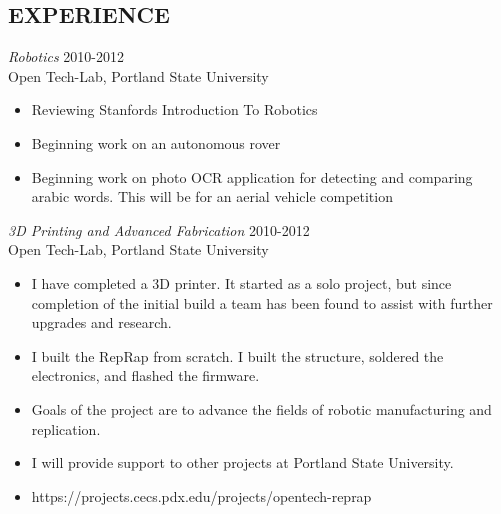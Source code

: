 \documentclass[margin]{res}
\begin{document}
\begin{resume}
\section{EXPERIENCE}
				{\sl Robotics} \hfill 2010-2012 \\
                Open Tech-Lab, Portland State University
				\begin{itemize}  \itemsep -2pt %
					\item   Reviewing Stanfords Introduction To Robotics
					\item	Beginning work on an autonomous rover
					\item   Beginning work on photo OCR application
							for detecting and comparing arabic words.  This 
							will be for an aerial vehicle competition
				\end{itemize}	
				{\sl 3D Printing and Advanced Fabrication} \hfill 2010-2012 \\
                Open Tech-Lab, Portland State University
				\begin{itemize}  \itemsep -2pt %
					\item   I have completed a 3D printer. It started as a solo project, 
							but since completion of the initial build a team has been found to
							assist with further upgrades and research.
					\item   I built the RepRap from scratch.  I built the structure, soldered 
							the electronics, and flashed the firmware.
					\item  	Goals of the project are to advance the fields of 
					 		robotic manufacturing and replication.
					\item	I will provide support to other projects at Portland State University.
					\item   https://projects.cecs.pdx.edu/projects/opentech-reprap
				\end{itemize}					
 				
\end{resume}
\end{document}
